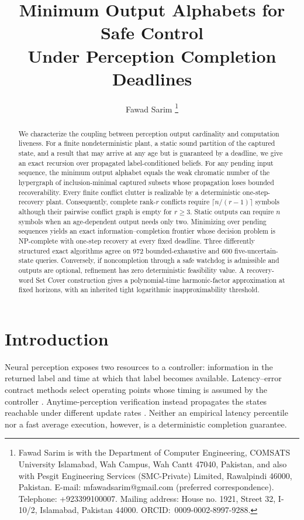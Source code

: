\documentclass[letterpaper,10pt,conference]{ieeeconf}
\title{Minimum Output Alphabets for Safe Control\\Under Perception Completion Deadlines}
\author{Fawad Sarim%
\thanks{Fawad Sarim is with the Department of Computer Engineering,
COMSATS University Islamabad, Wah Campus, Wah Cantt 47040, Pakistan, and also with
Pesgit Engineering Services (SMC-Private) Limited, Rawalpindi 46000, Pakistan.
E-mail: mfawadsarim@gmail.com (preferred
correspondence). Telephone: +923399100007.
Mailing address: House no. 1921, Street 32, I-10/2, Islamabad, Pakistan 44000.
\mbox{ORCID: 0009-0002-8997-9288}.}}
\begin{document}
\maketitle

\begin{abstract}
We characterize the coupling between perception output cardinality and computation liveness. For a
finite nondeterministic plant, a static sound partition of the captured state, and a result that may
arrive at any age but is guaranteed by a deadline, we give an exact recursion over propagated
label-conditioned beliefs. For any pending input sequence, the minimum output alphabet equals the
weak chromatic number of the hypergraph of inclusion-minimal captured subsets whose propagation
loses bounded recoverability. Every finite conflict clutter is realizable by a deterministic
one-step-recovery plant. Consequently, complete rank-$r$ conflicts require
$\lceil n/(r-1)\rceil$ symbols although their pairwise conflict graph is empty for \mbox{$r\ge3$}.
Static outputs can require $n$ symbols when an age-dependent output needs only two. Minimizing over
pending sequences yields an exact information--completion frontier whose decision problem is
NP-complete with one-step recovery at every fixed deadline. Three differently structured exact algorithms agree on 972
bounded-exhaustive and 600 five-uncertain-state queries. Conversely, if noncompletion through a safe
watchdog is admissible and outputs are optional, refinement has zero deterministic feasibility
value. A recovery-word Set Cover construction gives a polynomial-time harmonic-factor approximation
at fixed horizons, with an inherited tight logarithmic inapproximability threshold.
\end{abstract}

\section{Introduction}

Neural perception exposes two resources to a controller: information in the returned label and
time at which that label becomes available. Latency--error contract methods select operating points
whose timing is assumed by the controller \cite{pant2015,pant2021,aldana2023}. Anytime-perception
verification instead propagates the states reachable under different update rates
\cite{gupta2024,gupta2025}. Neither an empirical latency percentile nor a fast average execution,
however, is a deterministic completion guarantee.
\end{document}

